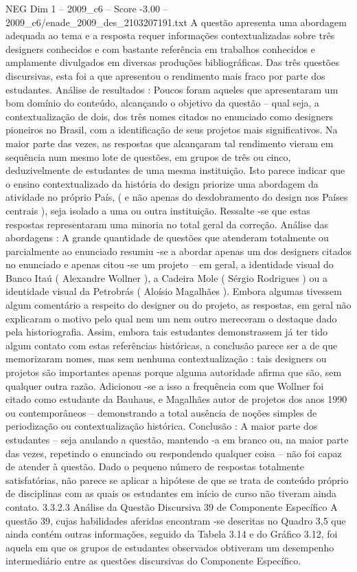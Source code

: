 \begin{textsample}{NEG Dim 1 – 2009\_c6 – Score -3.00 – 2009\_c6/enade\_2009\_des\_2103207191.txt}
A questão apresenta uma abordagem adequada ao tema e a resposta requer informações contextualizadas sobre três designers conhecidos e com bastante referência em trabalhos conhecidos e amplamente divulgados em diversas produções bibliográficas.
Das três questões discursivas, esta foi a que apresentou o rendimento mais fraco por parte dos estudantes.
Análise de resultados : Poucos foram aqueles que apresentaram um bom domínio do conteúdo, alcançando o objetivo da questão – qual seja, a contextualização de dois, dos três nomes citados no enunciado como designers pioneiros no Brasil, com a identificação de seus projetos mais significativos.
Na maior parte das vezes, as respostas que alcançaram tal rendimento vieram em sequência num mesmo lote de questões, em grupos de três ou cinco, deduzivelmente de estudantes de uma mesma instituição.
Isto parece indicar que o ensino contextualizado da história do design priorize uma abordagem da atividade no próprio País, ( e não apenas do desdobramento do design nos Países centrais ), seja isolado a uma ou outra instituição.
Ressalte -se que estas respostas representaram uma minoria no total geral da correção.
Análise das abordagens : A grande quantidade de questões que atenderam totalmente ou parcialmente ao enunciado resumiu -se a abordar apenas um dos designers citados no enunciado e apenas citou -se um projeto – em geral, a identidade visual do Banco Itaú ( Alexandre Wollner ), a Cadeira Mole ( Sérgio Rodrigues ) ou a identidade visual da Petrobrás ( Aloísio Magalhães ).
Embora algumas tivessem algum comentário a respeito do designer ou do projeto, as respostas, em geral não explicaram o motivo pelo qual nem um nem outro mereceram o destaque dado pela historiografia.
Assim, embora tais estudantes demonstrassem já ter tido algum contato com estas referências históricas, a conclusão parece ser a de que memorizaram nomes, mas sem nenhuma contextualização : tais designers ou projetos são importantes apenas porque alguma autoridade afirma que são, sem qualquer outra razão.
Adicionou -se a isso a frequência com que Wollner foi citado como estudante da Bauhaus, e Magalhães autor de projetos dos anos 1990 ou contemporâneos – demonstrando a total ausência de noções simples de periodização ou contextualização histórica.
Conclusão : A maior parte dos estudantes – seja anulando a questão, mantendo -a em branco ou, na maior parte das vezes, repetindo o enunciado ou respondendo qualquer coisa – não foi capaz de atender à questão.
Dado o pequeno número de respostas totalmente satisfatórias, não parece se aplicar a hipótese de que se trata de conteúdo próprio de disciplinas com as quais os estudantes em início de curso não tiveram ainda contato. 3.3.2.3 Análise da Questão Discursiva 39 de Componente Específico A questão 39, cujas habilidades aferidas encontram -se descritas no Quadro 3,5 que ainda contém outras informações, seguido da Tabela 3.14 e do Gráfico 3.12, foi aquela em que os grupos de estudantes observados obtiveram um desempenho intermediário entre as questões discursivas do Componente Específico.

\end{textsample}

